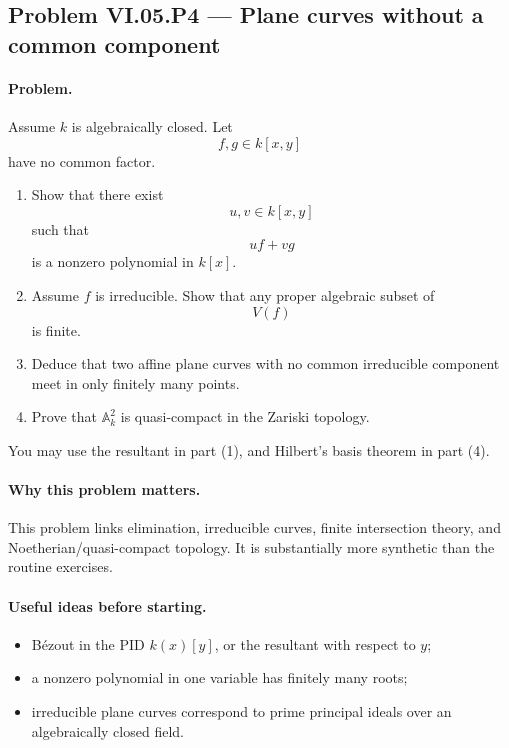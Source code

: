 \subsection*{Problem VI.05.P4 --- Plane curves without a common component}
\label{prob:vi-05-p4}

\paragraph{Problem.}
\label{prob:vi05-p4}
Assume \(k\) is algebraically closed.  Let
\[
f,g\in k[x,y]
\]
have no common factor.

\begin{enumerate}
  \item Show that there exist
        \[
        u,v\in k[x,y]
        \]
        such that
        \[
        uf+vg
        \]
        is a nonzero polynomial in \(k[x]\).
  \item Assume \(f\) is irreducible.  Show that any proper algebraic subset of
        \[
        V(f)
        \]
        is finite.
  \item Deduce that two affine plane curves with no common irreducible component meet in
        only finitely many points.
  \item Prove that \(\mathbb A_k^2\) is quasi-compact in the Zariski topology.
\end{enumerate}

You may use the resultant in part (1), and Hilbert's basis theorem in part (4).

\ifdefined\FullProblemDossiers

\paragraph{Why this problem matters.}
This problem links elimination, irreducible curves, finite intersection theory, and
Noetherian/quasi-compact topology.  It is substantially more synthetic than the routine
exercises.

\paragraph{Useful ideas before starting.}
\begin{itemize}
\item Bézout in the PID \(k(x)[y]\), or the resultant with respect to \(y\);
\item a nonzero polynomial in one variable has finitely many roots;
\item irreducible plane curves correspond to prime principal ideals over an algebraically
closed field.
\end{itemize}

